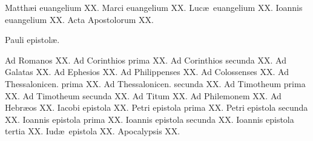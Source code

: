 \documentclass[a5paper,10pt]{book}
\def\ae{æ}
\begin{document}
\begin{multicols}{2}
\par \noindent Matth\ae i euangelium \hfill XX.
\newline Marci euangelium \hfill XX.
\newline Luc\ae \ euangelium \hfill XX.
\newline Ioannis euangelium \hfill XX.
\newline Acta Apostolorum \hfill XX.
\newline \vspace{-1.75em}
\begin{center}
\color{red} Pauli epistol\ae .
\end{center}
\vspace{-.75em}
\par\noindent Ad Romanos \hfill XX.
\newline Ad Corinthios prima \hfill XX.
\newline Ad Corinthios secunda \hfill XX.
\newline Ad Galatas \hfill XX.
\newline Ad Ephesios \hfill XX.
\newline Ad Philippenses \hfill XX.
\newline Ad Colossenses \hfill XX.
\newline Ad Thessalonicen. prima \hfill XX.
\newline Ad Thessalonicen. secunda \hfill XX.
\newline Ad Timotheum prima \hfill XX.
\newline Ad Timotheum secunda \hfill XX.
\newline Ad Titum \hfill XX.
\newline Ad Philemonem \hfill XX.
\newline Ad Hebr\ae os \hfill XX.
\newline Iacobi epistola \hfill XX.
\newline Petri epistola prima \hfill XX.
\newline Petri epistola secunda \hfill XX.
\newline Ioannis epistola prima \hfill XX.
\newline Ioannis epistola secunda \hfill XX.
\newline Ioannis epistola tertia \hfill XX.
\newline Iud\ae \ epistola \hfill XX.
\newline Apocalypsis \hfill XX.
\end{multicols}
\end{document}
